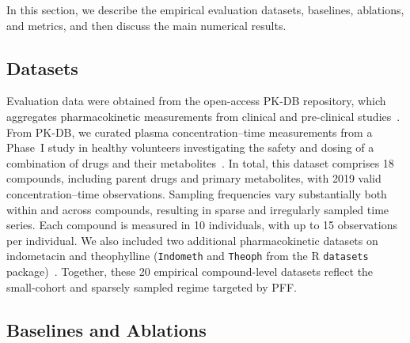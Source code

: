 In this section, we describe the empirical evaluation datasets, baselines, ablations, and metrics, and then discuss the main numerical results.

\subsection{Datasets}
\label{sec:data}
Evaluation data were obtained from the open-access PK-DB repository, which aggregates pharmacokinetic measurements from clinical and pre-clinical studies~\citep{grzegorzewski2021pkdb}.
%
From PK-DB, we curated plasma concentration--time measurements from a Phase~I study in healthy volunteers investigating the safety and dosing of a combination of drugs and their metabolites~\citep{lenuzza2016safety}.
%
In total, this dataset comprises 18 compounds, including parent drugs and primary metabolites, with 2019 valid concentration--time observations.
%
Sampling frequencies vary substantially both within and across compounds, resulting in sparse and irregularly sampled time series.
%
Each compound is measured in 10 individuals, with up to 15 observations per individual.
%
We also included two additional pharmacokinetic datasets on indometacin and theophylline (\texttt{Indometh} and \texttt{Theoph} from the R \texttt{datasets} package)~\citep{Rsoftware}.
%
Together, these 20 empirical compound-level datasets reflect the small-cohort and sparsely sampled regime targeted by PFF.

\subsection{Baselines and Ablations}
\label{sec:baselines}

